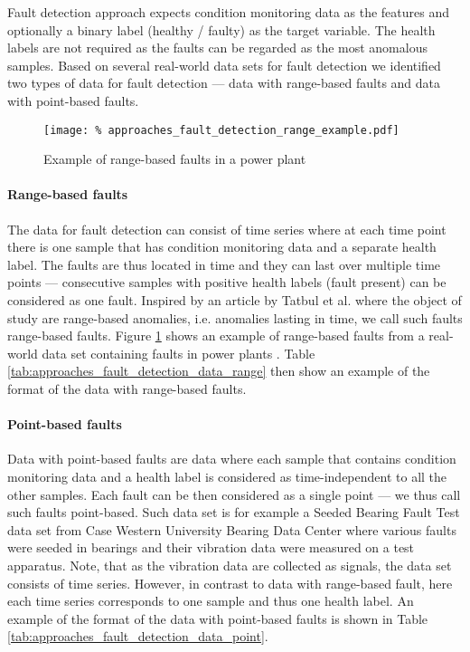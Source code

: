 Fault detection approach expects condition monitoring data as the features and optionally a binary label (healthy / faulty) as the target variable.
The health labels are not required as the faults can be regarded as the most anomalous samples.
Based on several real-world data sets for fault detection \cite{phm15, westernbearing, data_set_phm_2012, data_set_hydraulic_systems, data_set_aps_scania} we identified two types of data for fault detection --- data with range-based faults and data with point-based faults.

\begin{figure}
    \texttt{[image: \%
        approaches\_fault\_detection\_range\_example.pdf]}
    \centering
    \caption{Example of range-based faults in a power plant}
    \label{fig:approaches_fault_detection_range_example}
\end{figure}

\paragraph{Range-based faults}
The data for fault detection can consist of time series where at each time point there is one sample that has condition monitoring data and a separate health label.
The faults are thus located in time and they can last over multiple time points --- consecutive samples with positive health labels (fault present) can be considered as one fault.
Inspired by an article by Tatbul et al. \cite{tatbul2018precision} where the object of study are range-based anomalies, i.e. anomalies lasting in time, we call such faults range-based faults.
Figure \ref{fig:approaches_fault_detection_range_example} shows an example of range-based faults from a real-world data set containing faults in power plants \cite{phm15}.
Table  \ref{tab:approaches_fault_detection_data_range} then show an example of the format of the data with range-based faults.

\paragraph{Point-based faults}
Data with point-based faults are data where each sample that contains condition monitoring data and a health label is considered as time-independent to all the other samples.
Each fault can be then considered as a single point --- we thus call such faults point-based.
Such data set is for example a Seeded Bearing Fault Test data set from Case Western University Bearing Data Center \cite{westernbearing} where various faults were seeded in bearings and their vibration data were measured on a test apparatus.
Note, that as the vibration data are collected as signals, the data set consists of time series.
However, in contrast to data with range-based fault, here each time series corresponds to one sample and thus one health label.
An example of the format of the data with point-based faults is shown in Table \ref{tab:approaches_fault_detection_data_point}.

